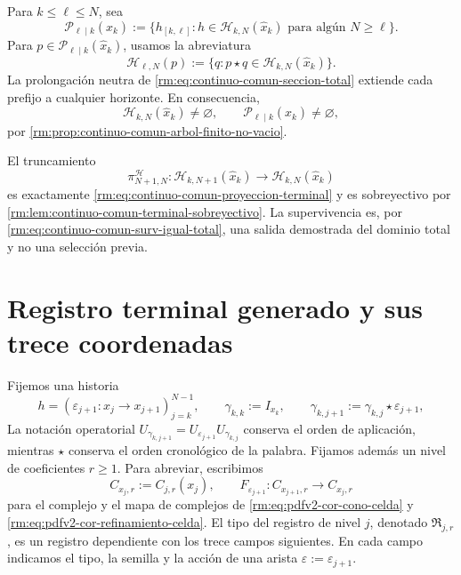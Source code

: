 Para \(k\leq\ell\leq N\), sea
\begin{equation}
\label{rm:eq:pdfv2-terminal-prefijos-intermedios}
 \mathscr P_{\ell\mid k}(\widehat x_k)
 :=\{h_{[k,\ell]}:h\in\mathscr H_{k,N}(\widehat x_k)
       \text{ para alg\'un }N\geq\ell\}.
\end{equation}
Para \(p\in\mathscr P_{\ell\mid k}(\widehat x_k)\), usamos la abreviatura
\begin{equation}
\label{rm:eq:pdfv2-terminal-continuaciones-prefijo}
 \mathscr H_{\ell,N}(p)
 :=\{q:p\star q\in\mathscr H_{k,N}(\widehat x_k)\}.
\end{equation}
La prolongaci\'on neutra de \eqref{rm:eq:continuo-comun-seccion-total} extiende
cada prefijo a cualquier horizonte. En consecuencia,
\begin{equation}
\label{rm:eq:pdfv2-terminal-no-vacuidad-historias}
 \mathscr H_{k,N}(\widehat x_k)\neq\varnothing,
 \qquad
 \mathscr P_{\ell\mid k}(\widehat x_k)\neq\varnothing,
\end{equation}
por \cref{rm:prop:continuo-comun-arbol-finito-no-vacio}.

El truncamiento
\begin{equation}
\label{rm:eq:pdfv2-terminal-truncamiento-historias}
 \pi_{N+1,N}^{\mathscr H}:
 \mathscr H_{k,N+1}(\widehat x_k)
 \longrightarrow\mathscr H_{k,N}(\widehat x_k)
\end{equation}
es exactamente \eqref{rm:eq:continuo-comun-proyeccion-terminal} y es
sobreyectivo por \cref{rm:lem:continuo-comun-terminal-sobreyectivo}. La
supervivencia es, por
\eqref{rm:eq:continuo-comun-surv-igual-total}, una salida demostrada del dominio
total y no una selecci\'on previa.

\section{Registro terminal generado y sus trece coordenadas}

Fijemos una historia
\[
 h=(\varepsilon_{j+1}:x_j\longrightarrow x_{j+1})_{j=k}^{N-1},
 \qquad
 \gamma_{k,k}:=I_{x_k},\qquad
 \gamma_{k,j+1}:=\gamma_{k,j}\star\varepsilon_{j+1},
\]
La notación operatorial
\(U_{\gamma_{k,j+1}}
=U_{\varepsilon_{j+1}}U_{\gamma_{k,j}}\) conserva el orden de aplicación,
mientras \(\star\) conserva el orden cronológico de la palabra. Fijamos
además un nivel de coeficientes \(r\geq1\). Para abreviar, escribimos
\[
 C_{x_j,r}:=C_{j,r}(x_j),\qquad
 F_{\varepsilon_{j+1}}:C_{x_{j+1},r}\longrightarrow C_{x_j,r}
\]
para el complejo y el mapa de complejos de
\eqref{rm:eq:pdfv2-cor-cono-celda} y
\eqref{rm:eq:pdfv2-cor-refinamiento-celda}. El tipo del registro de nivel
\(j\), denotado \(\mathfrak R_{j,r}\), es un registro dependiente con los
trece campos siguientes. En cada campo indicamos el tipo, la semilla y la
acción de una arista \(\varepsilon:=\varepsilon_{j+1}\).

